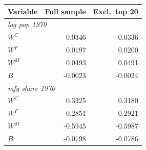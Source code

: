 \begin{tabular}{lrr}
\toprule
Variable & Full sample & Excl.\ top 20 \\
\midrule
\multicolumn{3}{l}{\emph{log pop 1970}} \\
\quad $W^C$ & 0.0346 & 0.0336 \\
\quad $W^F$ & 0.0197 & 0.0200 \\
\quad $W^M$ & 0.0493 & 0.0491 \\
\quad $B$ & -0.0023 & -0.0024 \\
\multicolumn{3}{l}{\emph{mfg share 1970}} \\
\quad $W^C$ & 0.3325 & 0.3180 \\
\quad $W^F$ & 0.2851 & 0.2921 \\
\quad $W^M$ & -0.5945 & -0.5987 \\
\quad $B$ & -0.0798 & -0.0786 \\
\bottomrule
\end{tabular}